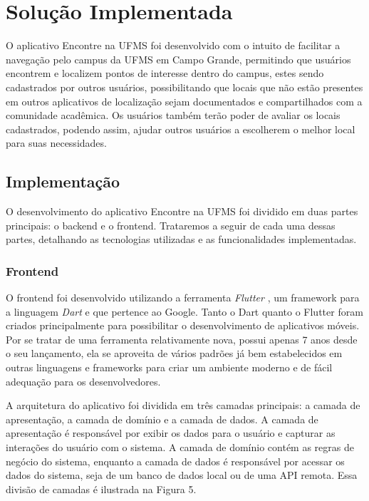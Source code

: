 \section{Solução Implementada}
\label{sec:implementacao}

    O aplicativo Encontre na UFMS foi desenvolvido com o intuito de facilitar a navegação pelo campus da UFMS em Campo Grande, permitindo que usuários encontrem e localizem pontos de interesse dentro do campus, estes sendo cadastrados por outros usuários, possibilitando que locais que não estão presentes em outros aplicativos de localização sejam documentados e compartilhados com a comunidade acadêmica. Os usuários também terão poder de avaliar os locais cadastrados, podendo assim, ajudar outros usuários a escolherem o melhor local para suas necessidades.

\subsection{Implementação}

    O desenvolvimento do aplicativo Encontre na UFMS foi dividido em duas partes principais: o backend e o frontend. Trataremos a seguir de cada uma dessas partes, detalhando as tecnologias utilizadas e as funcionalidades implementadas.

\subsubsection{Frontend}

    O frontend foi desenvolvido utilizando a ferramenta \textit{Flutter} \cite{flutter}, um framework para a linguagem \textit{Dart} \cite{dart} e que pertence ao Google. Tanto o Dart quanto o Flutter foram criados principalmente para possibilitar o desenvolvimento de aplicativos móveis. Por se tratar de uma ferramenta relativamente nova, possui apenas 7 anos desde o seu lançamento, ela se aproveita de vários padrões já bem estabelecidos em outras linguagens e frameworks para criar um ambiente moderno e de fácil adequação para os desenvolvedores.

    A arquitetura do aplicativo foi dividida em três camadas principais: a camada de apresentação, a camada de domínio e a camada de dados. A camada de apresentação é responsável por exibir os dados para o usuário e capturar as interações do usuário com o sistema. A camada de domínio contém as regras de negócio do sistema, enquanto a camada de dados é responsável por acessar os dados do sistema, seja de um banco de dados local ou de uma API remota. Essa divisão de camadas é ilustrada na Figura 5.

